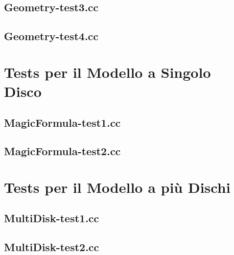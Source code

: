 \subsection{Geometry-test3.cc}
\renewcommand{\baselinestretch}{1.0}

\renewcommand{\baselinestretch}{1.25}
%
\subsection{Geometry-test4.cc}
\renewcommand{\baselinestretch}{1.0}

\renewcommand{\baselinestretch}{1.25}
%
\section{Tests per il Modello a Singolo Disco}
%
\subsection{MagicFormula-test1.cc}
\renewcommand{\baselinestretch}{1.0}

\renewcommand{\baselinestretch}{1.25}
%
\subsection{MagicFormula-test2.cc}
\renewcommand{\baselinestretch}{1.0}

\renewcommand{\baselinestretch}{1.25}
%
\section{Tests per il Modello a più Dischi}
%
\subsection{MultiDisk-test1.cc}
\renewcommand{\baselinestretch}{1.0}

\renewcommand{\baselinestretch}{1.25}
%
\subsection{MultiDisk-test2.cc}
\renewcommand{\baselinestretch}{1.0}

\renewcommand{\baselinestretch}{1.25}